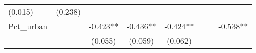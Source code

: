 \documentclass[]{article}
\begin{document}
\begin{longtable}[]{@{}lccccccc@{}}
\begin{minipage}[t]{0.10\columnwidth}
(0.015)\strut
\end{minipage} & \begin{minipage}[t]{0.10\columnwidth}\centering\strut
(0.238)\strut
\end{minipage}\tabularnewline
\begin{minipage}[t]{0.12\columnwidth}\raggedright\strut
Pct\_urban\strut
\end{minipage} & \begin{minipage}[t]{0.09\columnwidth}\centering\strut
\strut
\end{minipage} & \begin{minipage}[t]{0.10\columnwidth}\centering\strut
-0.423**\strut
\end{minipage} & \begin{minipage}[t]{0.10\columnwidth}\centering\strut
-0.436**\strut
\end{minipage} & \begin{minipage}[t]{0.10\columnwidth}\centering\strut
-0.424**\strut
\end{minipage} & \begin{minipage}[t]{0.10\columnwidth}\centering\strut
\strut
\end{minipage} & \begin{minipage}[t]{0.10\columnwidth}\centering\strut
\strut
\end{minipage} & \begin{minipage}[t]{0.10\columnwidth}\centering\strut
-0.538**\strut
\end{minipage}\tabularnewline
\begin{minipage}[t]{0.12\columnwidth}\raggedright\strut
\strut
\end{minipage} & \begin{minipage}[t]{0.09\columnwidth}\centering\strut
\strut
\end{minipage} & \begin{minipage}[t]{0.10\columnwidth}\centering\strut
(0.055)\strut
\end{minipage} & \begin{minipage}[t]{0.10\columnwidth}\centering\strut
(0.059)\strut
\end{minipage} & \begin{minipage}[t]{0.10\columnwidth}\centering\strut
(0.062)\strut
\end{minipage} & \begin{minipage}[t]{0.10\columnwidth}\centering\strut
\strut
\end{minipage} & \begin{minipage}[t]{0.10\columnwidth}\centering\strut

\end{minipage}
\end{longtable}
\end{document}
